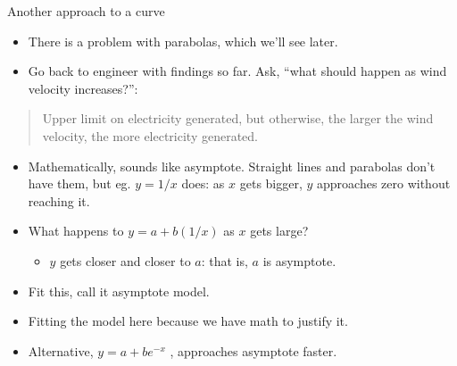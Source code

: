 \documentclass[
  ignorenonframetext,
]{beamer}
\providecommand{\tightlist}{%
  \setlength{\itemsep}{0pt}\setlength{\parskip}{0pt}}
\begin{document}
\begin{frame}{Another approach to a curve}
\protect\hypertarget{another-approach-to-a-curve}{}

\begin{itemize}
\tightlist
\item
  There is a problem with parabolas, which we'll see later.
\item
  Go back to engineer with findings so far. Ask, ``what should happen as
  wind velocity increases?'':
\end{itemize}

\begin{quote}
Upper limit on electricity generated, but otherwise, the larger the wind
velocity, the more electricity generated.
\end{quote}

\begin{itemize}
\tightlist
\item
  Mathematically, sounds like asymptote. Straight lines and parabolas
  don't have them, but eg. \(y = 1/x\) does: as \(x\) gets bigger, \(y\)
  approaches zero without reaching it.
\item
  What happens to \(y = a + b(1/x)\) as \(x\) gets large?

  \begin{itemize}
  \tightlist
  \item
    \(y\) gets closer and closer to \(a\): that is, \(a\) is asymptote.
  \end{itemize}
\item
  Fit this, call it asymptote model.
\item
  Fitting the model here because we have math to justify it.
\item
  Alternative, \(y = a + be^{−x}\) , approaches asymptote faster.
\end{itemize}

\end{frame}
\end{document}
